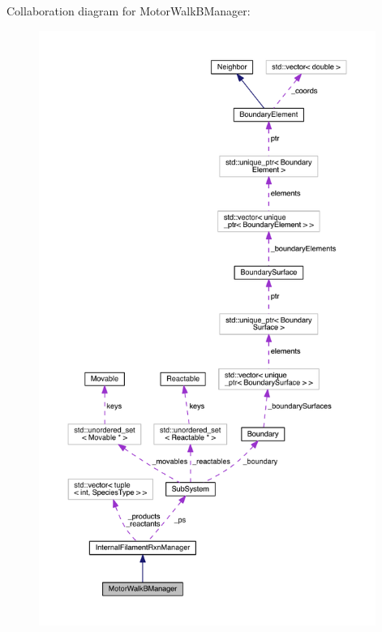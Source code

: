 Collaboration diagram for Motor\+Walk\+B\+Manager\+:\nopagebreak
\begin{figure}[H]
\begin{center}
\leavevmode
\includegraphics[height=550pt]{classMotorWalkBManager__coll__graph}
\end{center}
\end{figure}
